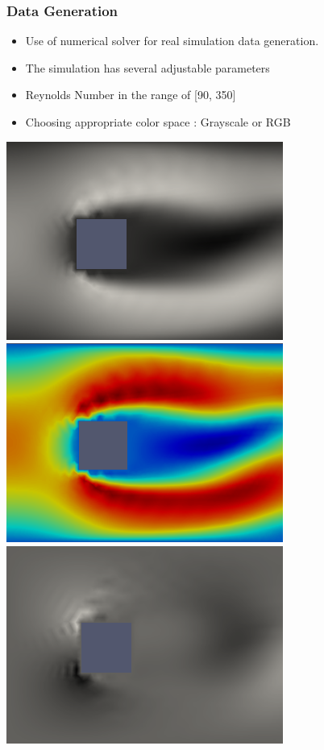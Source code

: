 \documentclass[18pt]{beamer}
\begin{document}
\begin{frame}[t]
  \frametitle{Data Generation}
  \begin{itemize}
  \item Use of numerical solver for real simulation data generation.
  \item The simulation has several adjustable parameters
  \item Reynolds Number in the range of [90, 350]
  \item Choosing appropriate color space : Grayscale or RGB
  \end{itemize}

  \begin{center}
    \includegraphics[scale=0.27]{images/x-direction-gray} \hspace{0.7cm}
    \includegraphics[scale=0.27]{images/x-direction-rgb} \\ \vspace{0.2cm}
    \includegraphics[scale=0.27]{images/y-direction-gray} \hspace{0.7cm}

\end{center}
\end{frame}
\end{document}
